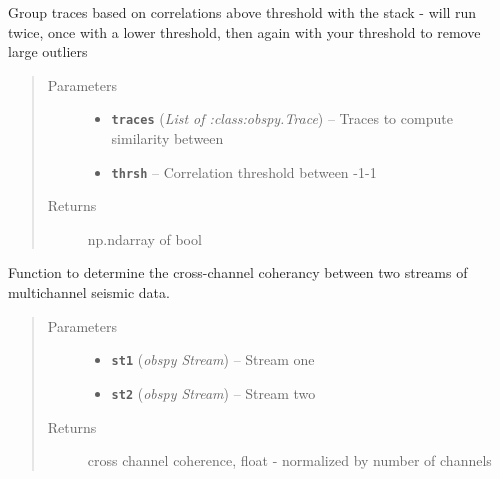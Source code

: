 \documentclass[a4paper,10pt,english]{sphinxmanual}
\begin{document}
\begin{fulllineitems}
\label{utils:clustering.corr_cluster}
Group traces based on correlations above threshold with the stack - will
run twice, once with a lower threshold, then again with your threshold to
remove large outliers
\begin{quote}\begin{description}
\item[{Parameters}] \leavevmode\begin{itemize}
\item {} 
\textbf{\texttt{traces}} (\emph{List of :class:obspy.Trace}) -- Traces to compute similarity between

\item {} 
\textbf{\texttt{thrsh}} -- Correlation threshold between -1-1

\end{itemize}

\item[{Returns}] \leavevmode
np.ndarray of bool

\end{description}\end{quote}

\end{fulllineitems}


\begin{fulllineitems}
\label{utils:clustering.cross_chan_coherence}
Function to determine the cross-channel coherancy between two streams of
multichannel seismic data.
\begin{quote}\begin{description}
\item[{Parameters}] \leavevmode\begin{itemize}
\item {} 
\textbf{\texttt{st1}} (\emph{obspy Stream}) -- Stream one

\item {} 
\textbf{\texttt{st2}} (\emph{obspy Stream}) -- Stream two

\end{itemize}

\item[{Returns}] \leavevmode
cross channel coherence, float - normalized by number of channels

\end{description}\end{quote}

\end{fulllineitems}
\end{document}
